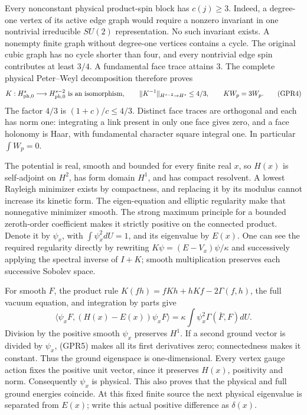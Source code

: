 \documentclass[11pt]{article}
\begin{document}
Every nonconstant physical product-spin block has \(c(j)\ge3\). Indeed, a degree-one vertex of its active edge graph would require a nonzero invariant in one nontrivial irreducible \(SU(2)\) representation. No such invariant exists. A nonempty finite graph without degree-one vertices contains a cycle. The original cubic graph has no cycle shorter than four, and every nontrivial edge spin contributes at least \(3/4\). A fundamental face trace attains \(3\). The complete physical Peter–Weyl decomposition therefore proves
\[
 K:H^s_{\rm ph,0}\longrightarrow H^{s-2}_{\rm ph,0}
 \text{ is an isomorphism},\qquad
 \|K^{-1}\|_{H^{s-2}\to H^s}\le4/3,
 \qquad KW_p=3W_p.
 \tag{GPR4}
\]
The factor \(4/3\) is \((1+c)/c\le4/3\). Distinct face traces are orthogonal and each has norm one: integrating a link present in only one face gives zero, and a face holonomy is Haar, with fundamental character square integral one. In particular \(\int W_p=0\).

The potential is real, smooth and bounded for every finite real \(x\), so \(H(x)\) is self-adjoint on \(H^2\), has form domain \(H^1\), and has compact resolvent. A lowest Rayleigh minimizer exists by compactness, and replacing it by its modulus cannot increase its kinetic form. The eigen-equation and elliptic regularity make that nonnegative minimizer smooth. The strong maximum principle for a bounded zeroth-order coefficient makes it strictly positive on the connected product. Denote it by \(\psi_x\), with \(\int\psi_x^2dU=1\), and its eigenvalue by \(E(x)\). One can see the required regularity directly by rewriting \(K\psi=(E-V_x)\psi/\kappa\) and successively applying the spectral inverse of \(I+K\); smooth multiplication preserves each successive Sobolev space.

For smooth \(F\), the product rule \(K(fh)=fKh+hKf-2\Gamma(f,h)\), the full vacuum equation, and integration by parts give
\[
 \langle\psi_xF,(H(x)-E(x))\psi_xF\rangle
 =\kappa\int\psi_x^2\Gamma(\bar F,F)dU.
 \tag{GPR5}
\]
Division by the positive smooth \(\psi_x\) preserves \(H^1\). If a second ground vector is divided by \(\psi_x\), (GPR5) makes all its first derivatives zero; connectedness makes it constant. Thus the ground eigenspace is one-dimensional. Every vertex gauge action fixes the positive unit vector, since it preserves \(H(x)\), positivity and norm. Consequently \(\psi_x\) is physical. This also proves that the physical and full ground energies coincide. At this fixed finite source the next physical eigenvalue is separated from \(E(x)\); write this actual positive difference as \(\delta(x)\).
\end{document}
